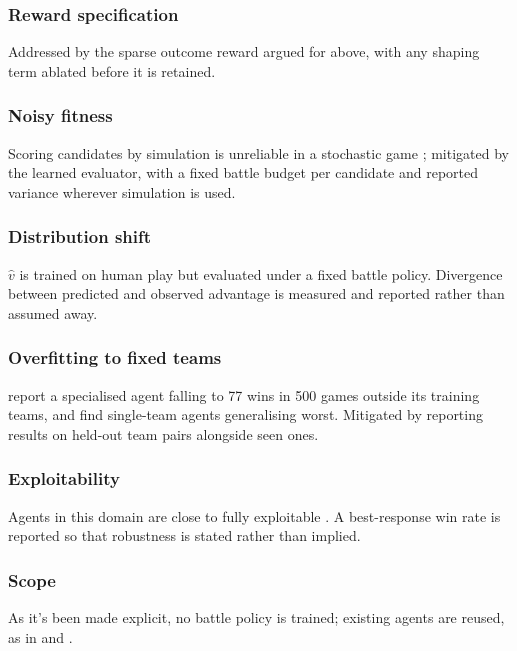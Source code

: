 \documentclass[conference]{IEEEtran}
\begin{document}
\subsubsection{Reward specification} Addressed by the sparse outcome reward argued for
above, with any shaping term ablated before it is retained.

\subsubsection{Noisy fitness} Scoring candidates by simulation is unreliable in a
stochastic game \cite{galway2008}; mitigated by the learned evaluator, with a
fixed battle budget per candidate and reported variance wherever simulation is
used.

\subsubsection{Distribution shift} $\hat{v}$ is trained on human play but evaluated
under a fixed battle policy. Divergence between predicted and observed
advantage is measured and reported rather than assumed away.

\subsubsection{Overfitting to fixed teams} \cite{huang2019} report a specialised agent
falling to 77 wins in 500 games outside its training teams, and
\cite{angliss2026} find single-team agents generalising worst. Mitigated by
reporting results on held-out team pairs alongside seen ones.

\subsubsection{Exploitability} Agents in this domain are close to fully exploitable
\cite{angliss2026}. A best-response win rate is reported so that robustness is
stated rather than implied.

\subsubsection{Scope} As it's been made explicit, no battle policy is trained; existing agents are reused, as in
\cite{reis2024} and \cite{reis2025}.
\end{document}
